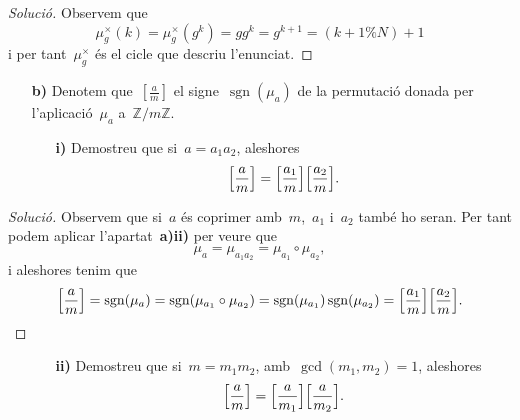 \documentclass[a4paper]{article}
\newcommand{\ZZ}{\mathbb{Z}}
\DeclareMathOperator{\sgn}{sgn}
\newenvironment{solution}{
    \renewcommand\qedsymbol{\ensuremath{\lozenge}}
    \begin{proof}[Solució]
        }{
    \end{proof}
}
\begin{document}
\begin{solution}
    Observem que
    \[
        \mu_{g}^{\times}(k)
        = \mu_{g}^{\times}(g^{k})
        = gg^{k}
        = g^{k+1}
        = (k+1\%N)+1
    \]
    i per tant~\(\mu_{g}^{\times}\) és el cicle que descriu l'enunciat.
\end{solution}

\begin{enumerate}
    \item[\textbf{b)}] Denotem que~\([\frac{a}{m}]\) el signe~\(\sgn(\mu_{a})\)
        de la permutació donada per l'aplicació~\(\mu_{a}\) a~\(\ZZ/m\ZZ\).
        \begin{enumerate}
            \item[\textbf{i)}] Demostreu que si~\(a=a_{1}a_{2}\), aleshores
                \[
                    \Bigl[\frac{a}{m}\Bigr]
                    =
                    \Bigl[\frac{a_{1}}{m}\Bigr]
                    \Bigl[\frac{a_{2}}{m}\Bigr].
                \]
        \end{enumerate}
\end{enumerate}

\begin{solution}
    Observem que si~\(a\) és coprimer amb~\(m\),~\(a_{1}\) i~\(a_{2}\) també ho
    seran. Per tant podem aplicar l'apartat~\textbf{a)ii)} per veure que
    \[
        \mu_{a} = \mu_{a_{1}a_{2}} = \mu_{a_{1}}\circ\mu_{a_{2}},
    \]
    i aleshores tenim que
    \[
        \Bigl[\frac{a}{m}\Bigr]
        = \sgn(\mu_{a})
        = \sgn(\mu_{a_{1}}\circ\mu_{a_{2}})
        = \sgn(\mu_{a_{1}})\sgn(\mu_{a_{2}})
        = \Bigl[\frac{a_{1}}{m}\Bigr]\Bigl[\frac{a_{2}}{m}\Bigr].
        \qedhere
    \]
\end{solution}

\clearpage

\begin{enumerate}
    \item[]\begin{enumerate}
        \item[\textbf{ii)}] Demostreu que si~\(m=m_{1}m_{2}\),
            amb~\(\gcd(m_{1},m_{2})=1\), aleshores
            \[
                \Bigl[\frac{a}{m}\Bigr]
                =
                \Bigl[\frac{a}{m_{1}}\Bigr]
                \Bigl[\frac{a}{m_{2}}\Bigr].
            \]
    \end{enumerate}
\end{enumerate}
\end{document}
